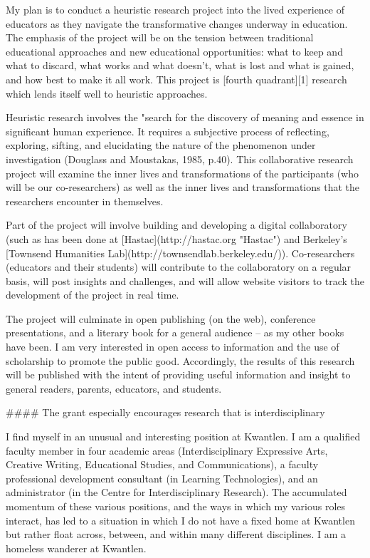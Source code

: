My plan is to conduct a heuristic research project into the lived experience of educators as they navigate the transformative changes underway in education. The emphasis of the project will be on the tension between traditional educational approaches and new educational opportunities: what to keep and what to discard, what works and what doesn't, what is lost and what is gained, and how best to make it all work. This project is [fourth quadrant][1] research which lends itself well to heuristic approaches.

Heuristic research involves the "search for the discovery of meaning and essence in significant human experience. It requires a subjective process of reflecting, exploring, sifting, and elucidating the nature of the phenomenon under investigation (Douglass and Moustakas, 1985, p.40). This collaborative research project will examine the inner lives and transformations of the participants (who will be our co-researchers) as well as the inner lives and transformations that the researchers encounter in themselves.

Part of the project will involve building and developing a digital collaboratory (such as has been done at [Hastac](http://hastac.org "Hastac") and Berkeley's [Townsend Humanities Lab](http://townsendlab.berkeley.edu/)). Co-researchers (educators and their students) will contribute to the collaboratory on a regular basis, will post insights and challenges, and will allow website visitors to track the development of the project in real time.

The project will culminate in open publishing (on the web), conference presentations, and a literary book for a general audience -- as my other books have been. I am very interested in open access to information and the use of scholarship to promote the public good. Accordingly, the results of this research will be published with the intent of providing useful information and insight to general readers, parents, educators, and students.

#### The grant especially encourages research that is interdisciplinary

I find myself in an unusual and interesting position at Kwantlen. I am a qualified faculty member in four academic areas (Interdisciplinary Expressive Arts, Creative Writing, Educational Studies, and Communications), a faculty professional development consultant (in Learning Technologies), and an administrator (in the Centre for Interdisciplinary Research). The accumulated momentum of these various positions, and the ways in which my various roles interact, has led to a situation in which I do not have a fixed home at Kwantlen but rather float across, between, and within many different disciplines. I am a homeless wanderer at Kwantlen. 

